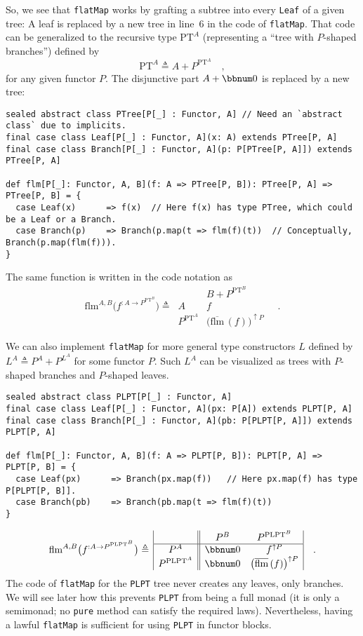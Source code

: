 So, we see that \lstinline!flatMap! works by grafting a subtree into
every \lstinline!Leaf! of a given tree: A leaf is replaced by a new
tree in line~6 in the code of \lstinline!flatMap!. That code can
be generalized to the recursive type $\text{PT}^{A}$ (representing
a \textsf{``}tree with $P$-shaped branches\textsf{''}) defined by
\[
\text{PT}^{A}\triangleq A+P^{\text{PT}^{A}}\quad,
\]
for any given functor $P$. The disjunctive part $A+\bbnum 0$ is
replaced by a new tree:
\begin{lstlisting}
sealed abstract class PTree[P[_] : Functor, A] // Need an `abstract class` due to implicits.
final case class Leaf[P[_] : Functor, A](x: A) extends PTree[P, A]
final case class Branch[P[_] : Functor, A](p: P[PTree[P, A]]) extends PTree[P, A]

def flm[P[_]: Functor, A, B](f: A => PTree[P, B]): PTree[P, A] => PTree[P, B] = {
  case Leaf(x)      => f(x)  // Here f(x) has type PTree, which could be a Leaf or a Branch.
  case Branch(p)    => Branch(p.map(t => flm(f)(t))  // Conceptually, Branch(p.map(flm(f))). 
}
\end{lstlisting}
The same function is written in the code notation as
\[
\text{flm}^{A,B}\big(f^{:A\rightarrow P^{\text{PT}^{B}}}\big)\triangleq\,\begin{array}{|c||c|}
 & B+P^{\text{PT}^{B}}\\
\hline A & f\\
P^{\text{PT}^{A}} & \big(\overline{\text{flm}}\,(f)\big)^{\uparrow P}
\end{array}\quad.
\]

We can also implement \lstinline!flatMap! for more general type constructors
$L$ defined by $L^{A}\triangleq P^{A}+P^{L^{A}}$ for some functor
$P$. Such $L^{A}$ can be visualized as trees with $P$-shaped branches
and $P$-shaped leaves.
\begin{lstlisting}
sealed abstract class PLPT[P[_] : Functor, A]
final case class Leaf[P[_] : Functor, A](px: P[A]) extends PLPT[P, A]
final case class Branch[P[_] : Functor, A](pb: P[PLPT[P, A]]) extends PLPT[P, A]

def flm[P[_]: Functor, A, B](f: A => PLPT[P, B]): PLPT[P, A] => PLPT[P, B] = {
  case Leaf(px)      => Branch(px.map(f))   // Here px.map(f) has type P[PLPT[P, B]].
  case Branch(pb)    => Branch(pb.map(t => flm(f)(t))
}
\end{lstlisting}
\[
\text{flm}^{A,B}\big(f^{:A\rightarrow P^{\text{PLPT}^{B}}}\big)\triangleq\,\begin{array}{|c||cc|}
 & P^{B} & P^{\text{PLPT}^{B}}\\
\hline P^{A} & \bbnum 0 & f^{\uparrow P}\\
P^{\text{PLPT}^{A}} & \bbnum 0 & \big(\overline{\text{flm}}\,(f)\big)^{\uparrow P}
\end{array}\quad.
\]
The code of \lstinline!flatMap! for the \lstinline!PLPT! tree never
creates any leaves, only branches. We will see later how this prevents
\lstinline!PLPT! from being a full monad (it is only a semimonad;
no \lstinline!pure! method can satisfy the required laws). Nevertheless,
having a lawful \lstinline!flatMap! is sufficient for using \lstinline!PLPT!
in functor blocks.

